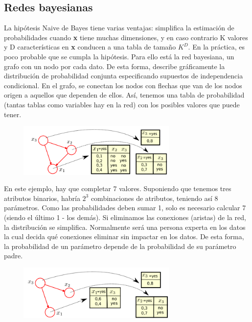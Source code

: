 \subsection{Redes bayesianas}
La hipótesis Naive de Bayes tiene varias ventajas: simplifica la estimación de probabilidades cuando \textbf{x} tiene muchas dimensiones, y en caso contrario K valores y D características en \textbf{x} conducen a una tabla de tamaño $K^D$. En la práctica, es poco probable que se cumpla la hipótesis. Para ello está la red bayesiana, un grafo con un nodo por cada dato. De esta forma, describe gráficamente la distribución de probabilidad conjunta especificando supuestos de independencia condicional. En el grafo, se conectan los nodos con flechas que van de los nodos origen a aquellos que dependen de ellos. Así, tenemos una tabla de probabilidad (tantas tablas como variables hay en la red) con los posibles valores que puede tener.

\begin{figure}[h]
\centering
\includegraphics[width = 0.7\textwidth]{figs/bayesian-network.png}
\end{figure}

En este ejemplo, hay que completar 7 valores. Suponiendo que tenemos tres atributos binarios, habría $2^3$ combinaciones de atributos, teniendo así 8 parámetros. Como las probabilidades deben sumar 1, solo es necesario calcular 7 (siendo el último 1 - los demás). Si eliminamos las conexiones (aristas) de la red, la distribución se simplifica. Normalmente será una persona experta en los datos la cual decida qué conexiones eliminar sin impactar en los datos. De esta forma, la probabilidad de un parámetro depende de la probabilidad de su parámetro padre. 

\begin{figure}[h]
\centering
\includegraphics[width = 0.7\textwidth]{figs/bayesian-network-reduced.png}
\end{figure}

